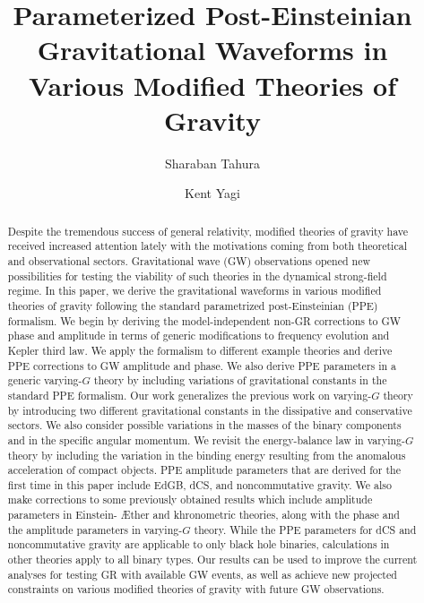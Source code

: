 \documentclass[prd,twocolumn,nofootinbib]{revtex4-1}
\begin{document}
\title{Parameterized Post-Einsteinian Gravitational Waveforms in \\ Various Modified Theories of Gravity}

\author{Sharaban Tahura}

\author{Kent Yagi}

\begin{abstract} 
Despite the tremendous success of general relativity, modified theories of gravity have received increased attention lately with the motivations coming from both theoretical and observational sectors.
Gravitational wave (GW) observations opened new possibilities for testing the viability of such theories in the dynamical strong-field regime.
In this paper, we derive the gravitational waveforms in various modified theories of gravity following the standard parametrized post-Einsteinian (PPE) formalism.
We begin by deriving the model-independent non-GR corrections to GW phase and amplitude in terms of generic modifications to frequency evolution and Kepler third law.
We apply the formalism to different example theories and derive PPE corrections to GW amplitude and phase.
We also derive PPE parameters in  a generic varying-$G$ theory by including variations of gravitational constants in the standard PPE formalism. Our work generalizes the previous work on varying-$G$ theory by introducing two different gravitational constants in the dissipative and conservative sectors. We also consider possible variations in the masses of the binary components and in the specific angular momentum. We revisit the energy-balance law in varying-$G$ theory by including the variation in the  binding energy resulting from the anomalous acceleration of compact objects.
PPE amplitude parameters that are derived for the first time in this paper include EdGB, dCS, and noncommutative gravity.
We also make corrections to some previously obtained results which include amplitude parameters in Einstein- \AE ther and khronometric theories, along with the phase and the amplitude parameters in varying-$G$ theory.
While the PPE parameters for dCS and noncommutative gravity are applicable to only black hole binaries, calculations in other theories apply to all binary types.
Our results can be used to improve the current analyses for testing GR with available GW events, as well as achieve new projected constraints on various modified theories of gravity with future GW observations.

\end{abstract}
\end{document}
